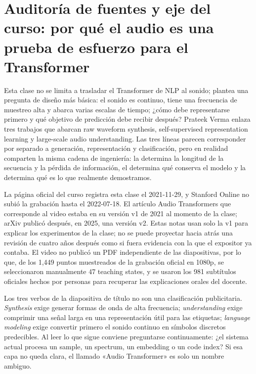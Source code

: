 \section{Auditoría de fuentes y eje del curso: por qué el audio es una prueba de esfuerzo para el Transformer}

Esta clase no se limita a trasladar el Transformer de NLP al sonido; plantea una pregunta de diseño más básica: el sonido es continuo, tiene una frecuencia de muestreo alta y abarca varias escalas de tiempo; ¿cómo debe representarse primero y qué objetivo de predicción debe recibir después? Prateek Verma enlaza tres trabajos que abarcan raw waveform synthesis, self-supervised representation learning y large-scale audio understanding. Las tres líneas parecen corresponder por separado a generación, representación y clasificación, pero en realidad comparten la misma cadena de ingeniería: la  determina la longitud de la secuencia y la pérdida de información, el  determina qué conserva el modelo y la  determina qué es lo que realmente demostramos.

La página oficial del curso registra esta clase el 2021-11-29, y Stanford Online no subió la grabación hasta el 2022-07-18. El artículo Audio Transformers que corresponde al video estaba en su versión v1 de 2021 al momento de la clase; arXiv publicó después, en 2025, una versión v2. Estas notas usan solo la v1 para explicar los experimentos de la clase; no se puede proyectar hacia atrás una revisión de cuatro años después como si fuera evidencia con la que el expositor ya contaba. El video no publicó un PDF independiente de las diapositivas, por lo que, de los 1,449 puntos muestreados de la grabación oficial en 1080p, se seleccionaron manualmente 47 teaching states, y se usaron los 981 subtítulos oficiales hechos por personas para recuperar las explicaciones orales del docente.


Los tres verbos de la diapositiva de título no son una clasificación publicitaria. \emph{Synthesis} exige generar formas de onda de alta frecuencia; \emph{understanding} exige comprimir una señal larga en una representación útil para las etiquetas; \emph{language modeling} exige convertir primero el sonido continuo en símbolos discretos predecibles. Al leer lo que sigue conviene preguntarse continuamente: ¿el sistema actual procesa un sample, un spectrum, un embedding o un code index? Si esa capa no queda clara, el llamado «Audio Transformer» es solo un nombre ambiguo.

